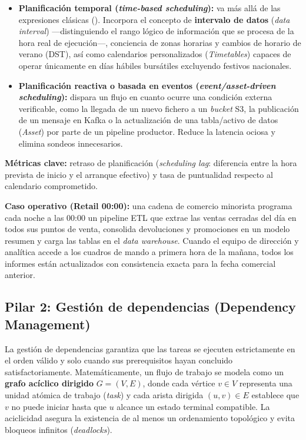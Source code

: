 \begin{itemize}
  \item \textbf{Planificación temporal (\textit{time-based scheduling}):} va más allá de las expresiones  clásicas (). Incorpora el concepto de \textbf{intervalo de datos} (\textit{data interval}) ---distinguiendo el rango lógico de información que se procesa de la hora real de ejecución---, conciencia de zonas horarias y cambios de horario de verano (DST), así como calendarios personalizados (\textit{Timetables}) capaces de operar únicamente en días hábiles bursátiles excluyendo festivos nacionales.
  \item \textbf{Planificación reactiva o basada en eventos (\textit{event/asset-driven scheduling}):} dispara un flujo en cuanto ocurre una condición externa verificable, como la llegada de un nuevo fichero a un \textit{bucket} S3, la publicación de un mensaje en Kafka o la actualización de una tabla/activo de datos (\textit{Asset}) por parte de un pipeline productor. Reduce la latencia ociosa y elimina sondeos innecesarios.
\end{itemize}

\textbf{Métricas clave:} retraso de planificación (\textit{scheduling lag}: diferencia entre la hora prevista de inicio y el arranque efectivo) y tasa de puntualidad respecto al calendario comprometido.

\textbf{Caso operativo (Retail 00:00):} una cadena de comercio minorista programa cada noche a las 00:00 un pipeline ETL que extrae las ventas cerradas del día en todos sus puntos de venta, consolida devoluciones y promociones en un modelo resumen y carga las tablas en el \textit{data warehouse}. Cuando el equipo de dirección y analítica accede a los cuadros de mando a primera hora de la mañana, todos los informes están actualizados con consistencia exacta para la fecha comercial anterior.

\subsection{Pilar 2: Gestión de dependencias (Dependency Management)}\label{subsec:pilar-dependencias}

La gestión de dependencias garantiza que las tareas se ejecuten estrictamente en el orden válido y solo cuando sus prerequisitos hayan concluido satisfactoriamente. Matemáticamente, un flujo de trabajo se modela como un \textbf{grafo acíclico dirigido} $G = (V, E)$, donde cada vértice $v \in V$ representa una unidad atómica de trabajo (\textit{task}) y cada arista dirigida $(u, v) \in E$ establece que $v$ no puede iniciar hasta que $u$ alcance un estado terminal compatible. La aciclicidad asegura la existencia de al menos un ordenamiento topológico y evita bloqueos infinitos (\textit{deadlocks}).


